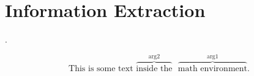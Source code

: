 \section{Information Extraction}
\Blindtext
\citep{goodfellow16}.

$$
\text{This is some text } \overbrace{\text{inside the}}^\text{arg2} \text{ } \overbrace{\text{math environment}}^\text{arg1} \text{.}
$$
